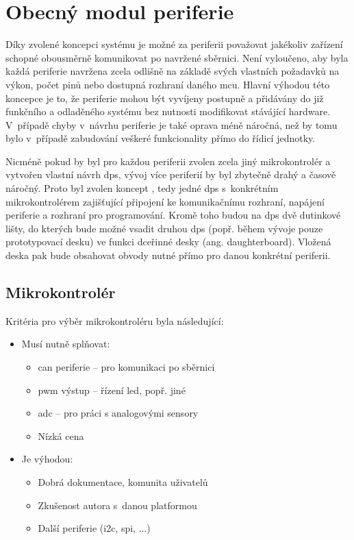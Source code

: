 \chapter{Obecný modul periferie}
\label{sec:modul-periferie}
    Díky zvolené koncepci systému je možné za periferii považovat jakékoliv zařízení schopné obousměrně komunikovat po navržené sběrnici. Není vyloučeno, aby byla každá periferie navržena zcela odlišně na základě svých vlastních požadavků na výkon, počet pinů nebo dostupná rozhraní daného \acs{mcu}. Hlavní výhodou této koncepce je to, že periferie mohou být vyvíjeny postupně a přidávány do již funkčního a odladěného systému bez nutnosti modifikovat stávájící hardware. V~případě chyby v~návrhu periferie je také oprava méně náročná, než by tomu bylo v~případě zabudování veškeré funkcionality přímo do řídicí jednotky. 

    Nicméně pokud by byl pro každou periferii zvolen zcela jiný mikrokontrolér a vytvořen vlastní návrh \acs{dps}, vývoj více periferií by byl zbytečně drahý a časově náročný. Proto byl zvolen koncept , tedy jedné \acs{dps} s~konkrétním mikrokontrolérem zajišťující připojení ke komunikačnímu rozhraní, napájení periferie a rozhraní pro programování. Kromě toho budou na \acs{dps} dvě dutinkové lišty, do kterých bude možné vsadit druhou \acs{dps} (popř. během vývoje pouze prototypovací desku) ve funkci dceřinné desky (ang. daughterboard). Vložená deska pak bude obsahovat obvody nutné přímo pro danou konkrétní periferii.
    
    \section{Mikrokontrolér}

        Kritéria pro výběr mikrokontroléru byla následující:
        \begin{itemize}
            \item Musí nutně splňovat:
            \begin{itemize}
                \item \acs{can} periferie -- pro komunikaci po sběrnici 
                \item \acs{pwm} výstup -- řízení \acs{led}, popř. jiné
                \item \acs{adc} -- pro práci s analogovými sensory
                \item Nízká cena 
            \end{itemize}
            \item Je výhodou:
            \begin{itemize}
                \item Dobrá dokumentace, komunita uživatelů
                \item Zkušenost autora s~danou platformou
                \item Další periferie (\acs{i2c}, \acs{spi}, ...)
            \end{itemize}
        \end{itemize}

